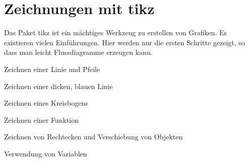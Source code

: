 
%
%

\chapter{Zeichnungen mit tikz}


Das Paket tikz ist ein mächtiges Werkzeug zu erstellen von Grafiken. Es existieren vielen Einführungen. Hier werden nur die ersten Schritte gezeigt, so dass man leicht Flussdiagramme erzeugen kann.

\bigskip

Zeichnen einer Linie und Pfeile



\medskip



\bigskip

Zeichnen einer dicken, blauen Linie



\medskip



\bigskip

Zeichnen eines Kreisbogens



\medskip



\bigskip

Zeichnen einer Funktion



\medskip



\bigskip

Zeichnen von Rechtecken und Verschiebung von Objekten



\medskip



\bigskip


\bigskip

Verwendung von Variablen



